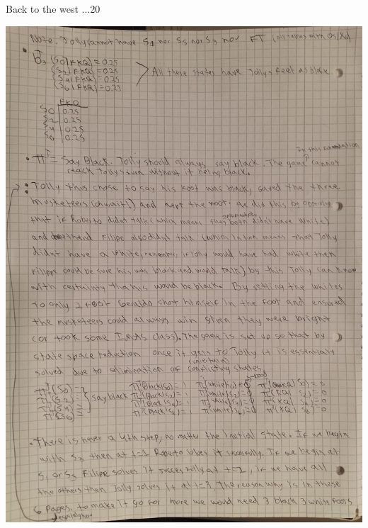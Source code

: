 \begin{questions}
\begin{question}{Back to the west ...}{20}
\begin{answer}
	\includegraphics[scale=0.2]{p6.jpg}
		\newpage

	\end{answer}
\end{question}




\end{questions}
